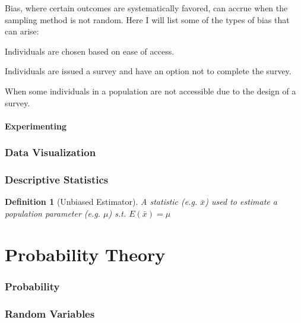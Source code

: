 \documentclass{article}
\newtheorem{mydef}{Definition}
\begin{document}
\noindent Bias, where certain outcomes are systematically favored, can accrue when the sampling method is not random.  Here I will list some of the types of bias that can arise:

\begin{description}[style=nextline]
\item [Convenience Bias] Individuals are chosen based on ease of access.

\item [Response Bias] Individuals are issued a survey and have an option not to complete the survey.

\item [Undercoverage Bias] When some individuals in a population are not accessible due to the design of a survey.

    
\end{description}

\noindent 
\begin{description}[style=nextline]
\item [] 

\end{description}


\subsection{Experimenting}


\section{Data Visualization}
\section{Descriptive Statistics}

\begin{mydef}[Unbiased Estimator]
A statistic (e.g. $\bar x$) used to estimate a population parameter (e.g. $\mu$) s.t. $E(\bar x) = \mu$ 
\end{mydef}

\newpage
\part{Probability Theory}
\section{Probability}
\section{Random Variables}
\end{document}
